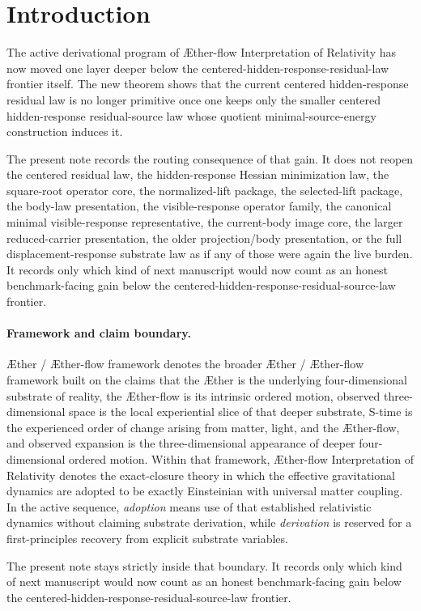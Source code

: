 \documentclass[11pt]{article}
\newcommand{\Aether}{\AE{}ther}
\newcommand{\Aflow}{\AE{}ther-flow}
\newcommand{\TheoryName}{\Aflow{} Interpretation of Relativity}
\newcommand{\TheoryProgram}{\Aether{} / \Aflow{} framework}
\begin{document}
\section{Introduction}

The active derivational program of \TheoryName{} has now moved one layer deeper below the centered-hidden-response-residual-law frontier itself. The new theorem shows that the current centered hidden-response residual law is no longer primitive once one keeps only the smaller centered hidden-response residual-source law whose quotient minimal-source-energy construction induces it.

The present note records the routing consequence of that gain. It does not reopen the centered residual law, the hidden-response Hessian minimization law, the square-root operator core, the normalized-lift package, the selected-lift package, the body-law presentation, the visible-response operator family, the canonical minimal visible-response representative, the current-body image core, the larger reduced-carrier presentation, the older projection/body presentation, or the full displacement-response substrate law as if any of those were again the live burden. It records only which kind of next manuscript would now count as an honest benchmark-facing gain below the centered-hidden-response-residual-source-law frontier.

\paragraph{Framework and claim boundary.}
\TheoryProgram{} denotes the broader \Aether{} / \Aflow{} framework built on the claims that the \Aether{} is the underlying four-dimensional substrate of reality, the \Aflow{} is its intrinsic ordered motion, observed three-dimensional space is the local experiential slice of that deeper substrate, S-time is the experienced order of change arising from matter, light, and the \Aflow{}, and observed expansion is the three-dimensional appearance of deeper four-dimensional ordered motion. Within that framework, \TheoryName{} denotes the exact-closure theory in which the effective gravitational dynamics are adopted to be exactly Einsteinian with universal matter coupling. In the active sequence, \emph{adoption} means use of that established relativistic dynamics without claiming substrate derivation, while \emph{derivation} is reserved for a first-principles recovery from explicit substrate variables.

The present note stays strictly inside that boundary. It records only which kind of next manuscript would now count as an honest benchmark-facing gain below the centered-hidden-response-residual-source-law frontier.
\end{document}
